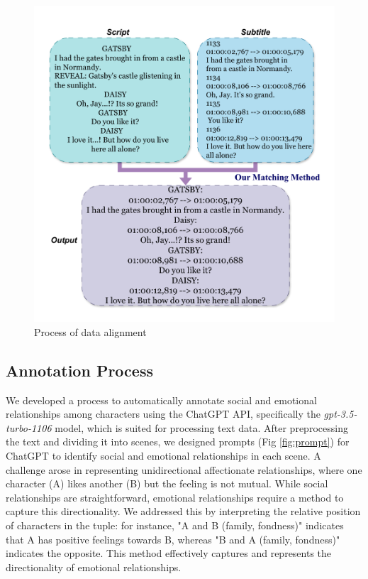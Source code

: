 \begin{figure}[ht]
    \small
    \centering 	 	 	 	
    \includegraphics[width=\linewidth, trim= 0 10 0 10, clip]{images/raw_data.pdf}
	\caption{Process of data alignment}
    \label{fig:alig}
\end{figure}

\subsection{Annotation Process}

We developed a process to automatically annotate social and emotional relationships among characters using the ChatGPT API, specifically the \textit{gpt-3.5-turbo-1106} model, which is suited for processing text data. After preprocessing the text and dividing it into scenes, we designed prompts (Fig \ref{fig:prompt}) for ChatGPT to identify social and emotional relationships in each scene. A challenge arose in representing unidirectional affectionate relationships, where one character (A) likes another (B) but the feeling is not mutual. While social relationships are straightforward, emotional relationships require a method to capture this directionality. We addressed this by interpreting the relative position of characters in the tuple: for instance, "A and B (family, fondness)" indicates that A has positive feelings towards B, whereas "B and A (family, fondness)" indicates the opposite. This method effectively captures and represents the directionality of emotional relationships.

